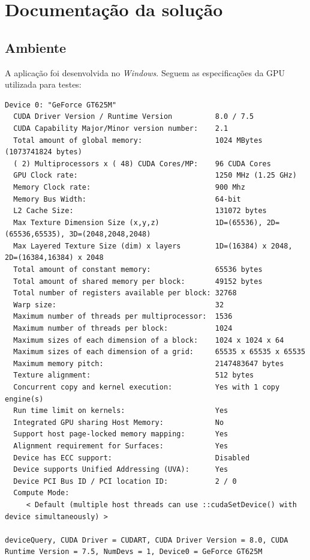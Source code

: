 \documentclass[a4paper,landscape,11pt]{article}
\begin{document}

\tableofcontents
\pagebreak


\section{Documentação da solução}

\subsection*{Ambiente}
A aplicação foi desenvolvida no \textit{Windows}. Seguem as especificações da GPU utilizada para testes:

\begin{lstlisting}
Device 0: "GeForce GT625M"
  CUDA Driver Version / Runtime Version          8.0 / 7.5
  CUDA Capability Major/Minor version number:    2.1
  Total amount of global memory:                 1024 MBytes (1073741824 bytes)
  ( 2) Multiprocessors x ( 48) CUDA Cores/MP:    96 CUDA Cores
  GPU Clock rate:                                1250 MHz (1.25 GHz)
  Memory Clock rate:                             900 Mhz
  Memory Bus Width:                              64-bit
  L2 Cache Size:                                 131072 bytes
  Max Texture Dimension Size (x,y,z)             1D=(65536), 2D=(65536,65535), 3D=(2048,2048,2048)
  Max Layered Texture Size (dim) x layers        1D=(16384) x 2048, 2D=(16384,16384) x 2048
  Total amount of constant memory:               65536 bytes
  Total amount of shared memory per block:       49152 bytes
  Total number of registers available per block: 32768
  Warp size:                                     32
  Maximum number of threads per multiprocessor:  1536
  Maximum number of threads per block:           1024
  Maximum sizes of each dimension of a block:    1024 x 1024 x 64
  Maximum sizes of each dimension of a grid:     65535 x 65535 x 65535
  Maximum memory pitch:                          2147483647 bytes
  Texture alignment:                             512 bytes
  Concurrent copy and kernel execution:          Yes with 1 copy engine(s)
  Run time limit on kernels:                     Yes
  Integrated GPU sharing Host Memory:            No
  Support host page-locked memory mapping:       Yes
  Alignment requirement for Surfaces:            Yes
  Device has ECC support:                        Disabled
  Device supports Unified Addressing (UVA):      Yes
  Device PCI Bus ID / PCI location ID:           2 / 0
  Compute Mode:
     < Default (multiple host threads can use ::cudaSetDevice() with device simultaneously) >

deviceQuery, CUDA Driver = CUDART, CUDA Driver Version = 8.0, CUDA Runtime Version = 7.5, NumDevs = 1, Device0 = GeForce GT625M
\end{lstlisting}
\end{document}
